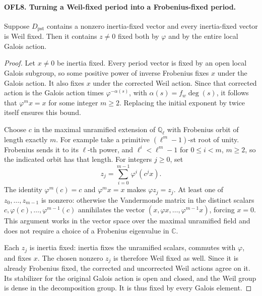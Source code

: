 \paragraph{OFL8. Turning a Weil-fixed period into a Frobenius-fixed period.}
\label{claim:OFL8}
Suppose \(D_{\mathrm{pst}}\) contains a nonzero inertia-fixed
vector and every inertia-fixed vector is Weil fixed.  Then it
contains \(z\ne0\) fixed both by \(\varphi\) and by the
entire local Galois action.
\begin{proof}
Let \(x\ne0\) be inertia fixed.  Every period vector is fixed
by an open local Galois subgroup, so some positive power of inverse
Frobenius fixes \(x\) under the Galois action.  It also fixes
\(x\) under the corrected Weil action.  Since that corrected
action is the Galois action times
\(\varphi^{-\alpha(s)}\), with
\(\alpha(s)=f_w\deg(s)\), it follows that
\(\varphi^m x=x\) for some integer \(m\ge2\).
Replacing the initial exponent by twice itself ensures this bound.

Choose \(c\) in the maximal unramified extension of
\(\mathbb Q_\ell\) with Frobenius orbit of length exactly
\(m\).  For example take a primitive
\((\ell^m-1)\)-st root of unity.  Frobenius sends it to
its \(\ell\)-th power, and
\(\ell^i<\ell^m-1\) for \(0\le i<m\), \(m\ge2\),
so the indicated orbit has that length.  For integers \(j\ge0\),
set
\[
                  z_j=\sum_{i=0}^{m-1}\varphi^i(c^j x).
 \tag{OFL.9}
\]
The identity \(\varphi^m(c)=c\) and
\(\varphi^m x=x\) makes \(\varphi z_j=z_j\).
At least one of \(z_0,\ldots,z_{m-1}\) is nonzero: otherwise
the Vandermonde matrix in the distinct scalars
\(c,\varphi(c),\ldots,\varphi^{m-1}(c)\) annihilates the
vector \((x,\varphi x,\ldots,\varphi^{m-1}x)\), forcing
\(x=0\).  This argument works in the vector space over the
maximal unramified field and does not require a choice of a
Frobenius eigenvalue in \(\mathbb C\).

Each \(z_j\) is inertia fixed: inertia fixes the unramified
scalars, commutes with \(\varphi\), and fixes \(x\).
The chosen nonzero \(z_j\) is therefore Weil fixed as well.
Since it is already Frobenius fixed, the corrected and uncorrected
Weil actions agree on it.  Its stabilizer for the original Galois
action is open and closed, and the Weil group is dense in the
decomposition group.  It is thus fixed by every Galois element.
\end{proof}

